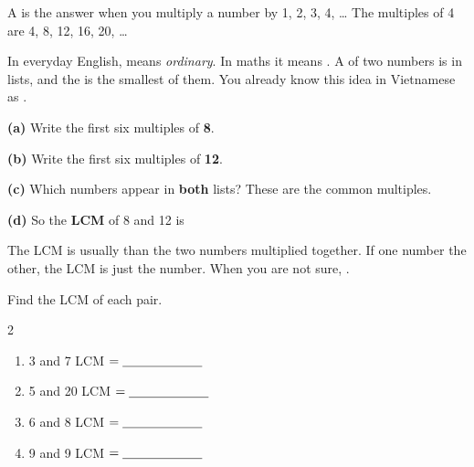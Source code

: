 \documentclass[12pt,a4paper]{article}
\begin{document}
\begin{remember}
  A  is the answer when you multiply a number by 1, 2, 3, 4, \ldots
  The multiples of 4 are 4, 8, 12, 16, 20, \ldots

  \medskip
  In everyday English,  means \emph{ordinary}. In maths it means
  . A  of two numbers is in  lists, and the
   is the smallest of them. You already know this
  idea in Vietnamese as .
\end{remember}


\noindent\textbf{(a)} Write the first six multiples of \textbf{8}.
\vspace{4pt}

\noindent\hspace*{1em}\blank[13cm]

\vspace{10pt}
\noindent\textbf{(b)} Write the first six multiples of \textbf{12}.
\vspace{4pt}

\noindent\hspace*{1em}\blank[13cm]

\vspace{10pt}
\noindent\textbf{(c)} Which numbers appear in \textbf{both} lists? These are the
common multiples.
\vspace{4pt}

\noindent\hspace*{1em}\blank[13cm]

\vspace{10pt}
\noindent\textbf{(d)} So the \textbf{LCM} of 8 and 12 is \blank[3cm]


\begin{remember}
  The LCM is usually  than the two numbers multiplied together.
  If one number  the other, the LCM is just the  number.
  When you are not sure, .
\end{remember}

\noindent Find the LCM of each pair.

\vspace{8pt}
\begin{multicols}{2}
\begin{enumerate}[label=(\alph*), itemsep=12pt]
  \item 3 and 7 \quad LCM $= \blank[2.2cm]$
  \item 5 and 20 \quad LCM $= \blank[2.2cm]$
  \item 6 and 8 \quad LCM $= \blank[2.2cm]$
  \item 9 and 9 \quad LCM $= \blank[2.2cm]$
\end{enumerate}
\end{multicols}
\end{document}

